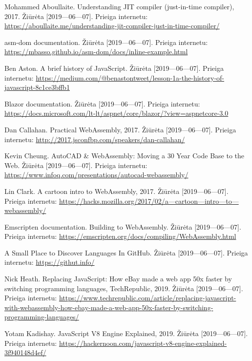 \documentclass{VUMIFPSkursinis}
\begin{document}
\begin{thebibliography}{99}

Mohammed Aboullaite. Understanding JIT compiler (just-in-time compiler), 2017. Žiūrėta [2019—06—07]. Prieiga internetu: \url{https://aboullaite.me/understanding-jit-compiler-just-in-time-compiler/}

asm-dom documentation. Žiūrėta [2019—06—07]. Prieiga internetu: \url{https://mbasso.github.io/asm-dom/docs/inline-example.html}

Ben Aston. A brief history of JavaScript. Žiūrėta [2019—06—07]. Prieiga internetu: \url{https://medium.com/@benastontweet/lesson-1a-the-history-of-javascript-8c1ce3bffb1}

Blazor documentation. Žiūrėta [2019—06—07]. Prieiga internetu: \url{https://docs.microsoft.com/lt-lt/aspnet/core/blazor/?view=aspnetcore-3.0}

Dan Callahan. Practical WebAssembly, 2017. Žiūrėta [2019—06—07]. Prieiga internetu: \url{http://2017.jsconfbp.com/speakers/dan-callahan/}

Kevin Cheung. AutoCAD & WebAssembly: Moving a 30 Year Code Base to the Web. Žiūrėta [2019—06—07]. Prieiga internetu: \url{https://www.infoq.com/presentations/autocad-webassembly/}

Lin Clark. A cartoon intro to WebAssembly, 2017. Žiūrėta [2019—06—07]. Prieiga internetu: \url{https://hacks.mozilla.org/2017/02/a—cartoon—intro—to—webassembly/}

Emscripten documentation. Building to WebAssembly. Žiūrėta [2019—06—07]. Prieiga internetu: \url{https://emscripten.org/docs/compiling/WebAssembly.html}

A Small Place to Discover Languages In GitHub. Žiūrėta [2019—06—07]. Prieiga internetu: \url{https://githut.info/}

Nick Heath. Replacing JavaScript: How eBay made a web app 50x faster by switching programming languages, TechRepublic, 2019. Žiūrėta [2019—06—07]. Prieiga internetu:
\url{https://www.techrepublic.com/article/replacing-javascript-with-webassembly-how-ebay-made-a-web-app-50x-faster-by-switching-programming-languages/}

Yotam Kadishay. JavaScript V8 Engine Explained, 2019. Žiūrėta [2019—06—07]. Prieiga internetu: \url{https://hackernoon.com/javascript-v8-engine-explained-3f940148d4ef/}


\end{thebibliography}
\end{document}
